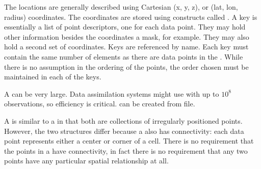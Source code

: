 \documentclass[letterpaper,10pt,english]{sphinxmanual}
\begin{document}
The locations are generally described using Cartesian (x, y, z), or
(lat, lon, radius) coordinates. The coordinates are stored using constructs
called . A key is essentially a list of point descriptors, one for each data
point. They may hold other information besides the coordinates \sphinxhyphen{} a mask, for
example. They may also hold a second set of coordinates. Keys are referenced by
name. Each key must contain the same number of elements as there are data points
in the {\hyperref[\detokenize{locstream:ESMF.api.locstream.LocStream}]{}}. While there is no assumption in the ordering of the points,
the order chosen must be maintained in each of the keys.

A {\hyperref[\detokenize{locstream:ESMF.api.locstream.LocStream}]{}} can be very large. Data assimilation systems might use {\hyperref[\detokenize{locstream:ESMF.api.locstream.LocStream}]{}}
with up to \(10^8\) observations, so efficiency is critical. {\hyperref[\detokenize{locstream:ESMF.api.locstream.LocStream}]{}} can be
created from file.

A {\hyperref[\detokenize{locstream:ESMF.api.locstream.LocStream}]{}} is similar to a {\hyperref[\detokenize{mesh:ESMF.api.mesh.Mesh}]{}} in that both are collections of irregularly
positioned points. However, the two structures differ because a {\hyperref[\detokenize{mesh:ESMF.api.mesh.Mesh}]{}} also has
connectivity: each data point represents either a center or corner of a cell.
There is no requirement that the points in a {\hyperref[\detokenize{locstream:ESMF.api.locstream.LocStream}]{}} have connectivity, in
fact there is no requirement that any two points have any particular spatial
relationship at all.
\end{document}
